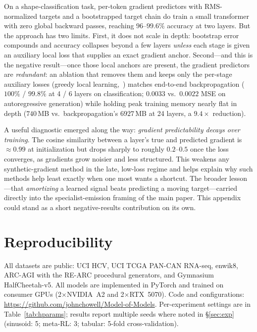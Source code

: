 \documentclass[11pt]{article}
\begin{document}
On a shape-classification task, per-token gradient predictors with RMS-normalized
targets and a bootstrapped target chain do train a small transformer with zero global
backward passes, reaching $96$--$99.6\%$ accuracy at two layers. But the approach has
two limits. First, it does not scale in depth: bootstrap error compounds and accuracy
collapses beyond a few layers \emph{unless} each stage is given an auxiliary local
loss that supplies an exact gradient anchor. Second---and this is the negative
result---once those local anchors are present, the gradient predictors are
\emph{redundant}: an ablation that removes them and keeps only the per-stage auxiliary
losses (greedy local learning,~\citealp{nokland2019local,belilovsky2019greedy})
matches end-to-end backpropagation ($100\%$ / $99.8\%$ at 4 / 6 layers on
classification; $0.0033$ vs.\ $0.0022$ MSE on autoregressive generation) while holding
peak training memory nearly flat in depth ($740$\,MB vs.\ backpropagation's $6927$\,MB
at 24 layers, a $9.4\times$ reduction).

A useful diagnostic emerged along the way: \emph{gradient predictability decays over
training}. The cosine similarity between a layer's true and predicted gradient is
$\approx0.99$ at initialization but drops sharply to roughly $0.2$--$0.5$ once the
loss converges, as gradients grow noisier and less structured. This weakens any
synthetic-gradient method in the late, low-loss regime and helps explain why such
methods help least exactly when one most wants a shortcut. The broader lesson---that
\emph{amortizing} a learned signal beats predicting a moving target---carried directly
into the specialist-emission framing of the main paper. This appendix could stand as a
short negative-results contribution on its own.

\section{Reproducibility}
All datasets are public: UCI HCV, UCI TCGA PAN-CAN RNA-seq, enwik8, ARC-AGI with the
RE-ARC procedural generators, and Gymnasium HalfCheetah-v5. All models are implemented
in PyTorch and trained on consumer GPUs (2$\times$NVIDIA~A2 and 2$\times$RTX~5070).
Code and configurations: \url{https://github.com/johnchowell/Model-of-Models}. Per-experiment settings are in
Table~\ref{tab:hparams}; results report multiple seeds where noted in
\S\ref{sec:exp} (sinusoid: 5; meta-RL: 3; tabular: 5-fold cross-validation).
\end{document}
